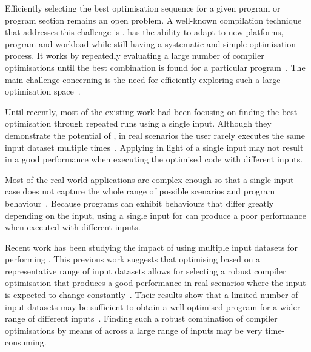 Efficiently selecting the best optimisation sequence for a given program or program section remains an open problem.
A well-known compilation technique that addresses this challenge is {\itercomp}.
{\Itercomp} has the ability to adapt to new platforms, program and workload while still having a systematic and simple optimisation process.
It works by repeatedly evaluating a large number of compiler optimisations until the best combination is found for a particular program~\citep{fursin07,chen10}.
The main challenge concerning {\itercomp} is the need for efficiently exploring such a large optimisation space~\citep{fursin07,cavazos07,zhou12}.

Until recently, most of the existing work had been focusing on finding the best optimisation through repeated runs using a single input.
Although they demonstrate the potential of {\itercomp}, in real scenarios the user rarely executes the same input dataset multiple times~\citep{bodin98,kisuki99,stephenson03,kulkarni04,agakov06}.
Applying {\itercomp} in light of a single input may not result in a good performance when executing the optimised code with different inputs.

Most of the real-world applications are complex enough so that a single input case does not capture the whole range of possible scenarios and program behaviour~\citep{haneda06,fursin07,chen10,chen12a}.
Because programs can exhibit behaviours that differ greatly depending on the input,
using a single input for {\itercomp} can produce a poor performance when executed with different inputs.

Recent work has been studying the impact of using multiple input datasets for performing {\itercomp}.
This previous work suggests that optimising based on a representative range of input datasets allows for selecting a robust compiler optimisation that produces a good performance in real scenarios where the input is expected to change constantly~\citep{haneda06,fursin07,chen10,chen12a,chen12b,fang15,mpeis16}.
Their results show that a limited number of input datasets may be sufficient to obtain a well-optimised program for a wider range of different inputs~\citep{haneda06,fursin07,chen10,chen12a}.
Finding such a robust combination of compiler optimisations by means of {\itercomp} across a large range of inputs may be very time-consuming.

